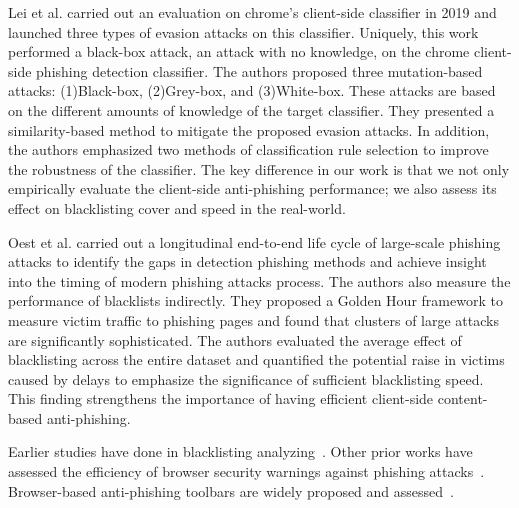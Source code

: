 \documentclass[letterpaper,twocolumn,10pt]{article}
\begin{document}

Lei et al.\cite{lei2020advanced} carried out an evaluation on chrome's client-side classifier in 2019 and launched three types of evasion attacks on this classifier.
Uniquely, this work performed a black-box attack, an attack with no knowledge, on the chrome client-side phishing detection classifier.
The authors proposed three mutation-based attacks: (1)Black-box, (2)Grey-box, and (3)White-box. These attacks are based on the different amounts of knowledge of the target classifier. 
They presented a similarity-based method to mitigate the proposed evasion attacks. 
In addition, the authors emphasized two methods of classification rule selection to improve the robustness of the classifier.
The key difference in our work is that we not only empirically evaluate the client-side anti-phishing performance; we also assess its effect on blacklisting cover and speed in the real-world.  







Oest et al.\cite{oest2020sunrise} carried out a longitudinal end-to-end life cycle of large-scale phishing attacks to identify the gaps in detection phishing methods and achieve insight into the timing of modern phishing attacks process. The authors also measure the performance of blacklists indirectly. 
They proposed a Golden Hour framework to measure victim traffic to phishing pages and found that clusters of large attacks are significantly sophisticated.
The authors evaluated the average effect of blacklisting across the entire dataset and quantified the potential raise in victims caused by delays to emphasize the significance of sufficient blacklisting speed. This finding strengthens the importance of having efficient client-side content-based anti-phishing.



Earlier studies have done in blacklisting analyzing~\cite{virvilis2014mobile,abrams2013browser,sheng2009empirical}.
Other prior works have assessed the efficiency of browser security warnings against phishing attacks~\cite{akhawe2013alice,egelman2008you,dhamija2006phishing,sunshine2009crying}. Browser-based anti-phishing toolbars are widely proposed and assessed~\cite{tsalis2014browser,huang2009browser,mazher2013web,yue2008anti,marchal2017off}.
\end{document}
